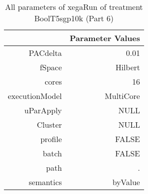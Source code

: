 \begin{table}[ht]
\centering
\begin{tabular}{rr}
  \hline
 & Parameter Values \\ 
  \hline
PACdelta & 0.01 \\ 
  fSpace & Hilbert \\ 
  cores & 16 \\ 
  executionModel & MultiCore \\ 
  uParApply & NULL \\ 
  Cluster & NULL \\ 
  profile & FALSE \\ 
  batch & FALSE \\ 
  path & . \\ 
  semantics & byValue \\ 
   \hline
\end{tabular}
\caption{ All parameters of xegaRun of treatment BoolT5sgp10k 
 (Part 6)} 
\end{table}
